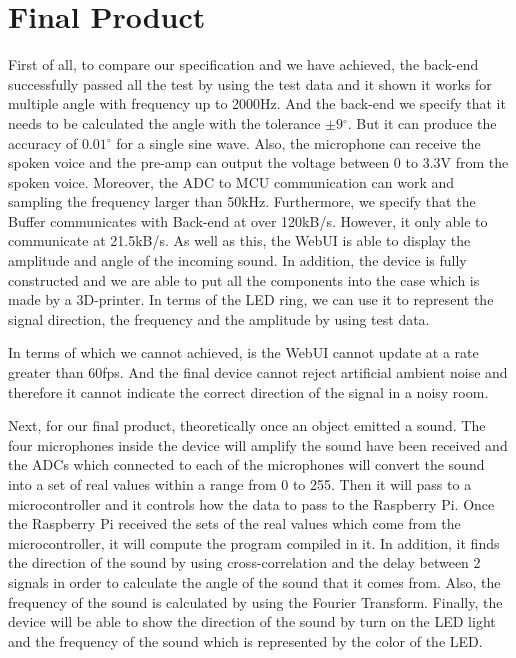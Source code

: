 \documentclass[a4paper]{article}
\begin{document}
\section{Final Product}

First of all, to compare our specification and we have achieved, the back-end
successfully passed all the test by using the test data and it shown it works
for multiple angle with frequency up to 2000Hz. And the back-end we specify that
it needs to be calculated the angle with the tolerance \(\pm 9{^\circ}\). But it
can produce the accuracy of \(0.01{^\circ}\) for a single sine wave. Also, the
microphone can receive the spoken voice and the pre-amp can output the voltage
between 0 to 3.3V from the spoken voice. Moreover, the ADC to MCU communication
can work and sampling the frequency larger than 50kHz. Furthermore, we specify
that the Buffer communicates with Back-end at over 120kB/s.  However, it only
able to communicate at 21.5kB/s. As well as this, the WebUI is able to display
the amplitude and angle of the incoming sound.  In addition, the device is fully
constructed and we are able to put all the components into the case which is
made by a 3D-printer. In terms of the LED ring, we can use it to represent the
signal direction, the frequency and the amplitude by using test data.

In terms of which we cannot achieved, is the WebUI cannot update at a rate
greater than 60fps. And the final device cannot reject artificial ambient noise
and therefore it cannot indicate the correct direction of the signal in a noisy
room.

Next, for our final product, theoretically once an object emitted a sound. The
four microphones inside the device will amplify the sound have been received and
the ADCs which connected to each of the microphones will convert the sound into
a set of real values within a range from 0 to 255. Then it will pass to a
microcontroller and it controls how the data to pass to the Raspberry Pi. Once
the Raspberry Pi received the sets of the real values which come from the
microcontroller, it will compute the program compiled in it. In addition, it
finds the direction of the sound by using cross-correlation and the delay
between 2 signals in order to calculate the angle of the sound that it comes
from. Also, the frequency of the sound is calculated by using the Fourier
Transform. Finally, the device will be able to show the direction of the sound
by turn on the LED light and the frequency of the sound which is represented by
the color of the LED.
\end{document}
